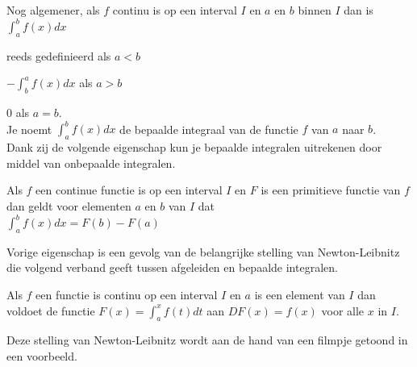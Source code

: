 \noindent Nog algemener, als $f$ continu is op een interval $I$ en $a$ en $b$ binnen $I$ dan is $\int ^b_a f(x)dx$

\hspace{1cm} reeds gedefinieerd als $a<b$

\hspace{1cm} $-\int^a_b f(x)dx$ als $a>b$

\hspace{1cm} 0 als $a=b$.\\

\noindent Je noemt $\int^b_a f(x)dx$ de bepaalde integraal van de functie $f$ van $a$ naar $b$.\\

\noindent Dank zij de volgende eigenschap kun je bepaalde integralen uitrekenen door middel van onbepaalde integralen.

\begin{eigenschap} Als $f$ een continue functie is op een interval $I$ en $F$ is een primitieve functie van $f$ dan geldt voor elementen $a$ en $b$ van $I$ dat\\
	$\boxed { \int^b_a f(x)dx = F(b)-F(a) }$
\end{eigenschap}

\noindent Vorige eigenschap is een gevolg van de belangrijke stelling van Newton-Leibnitz die volgend verband geeft tussen afgeleiden en bepaalde integralen.

\begin{eigenschap}
	Als $f$ een functie is continu op een interval $I$ en $a$ is een element van $I$ dan voldoet de functie $F(x) = \int^x_a f(t)dt$ aan $DF(x)=f(x)$ voor alle $x$ in $I$.
\end{eigenschap}

\noindent Deze stelling van Newton-Leibnitz wordt aan de hand van een filmpje getoond in een voorbeeld.

